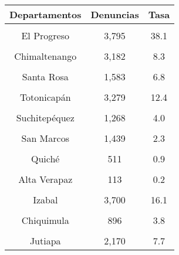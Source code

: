 \begin{tabular}[t]{ccc}
\toprule
\textbf{Departamentos} & \textbf{Denuncias} & \textbf{Tasa}\\
\midrule
\cellcolor[HTML]{B6B3FF}{Guatemala} & \cellcolor[HTML]{B6B3FF}{9,562} & \cellcolor[HTML]{B6B3FF}{5.1}\\
El Progreso & 3,795 & 38.1\\
\cellcolor[HTML]{B6B3FF}{Sacatepéquez} & \cellcolor[HTML]{B6B3FF}{1,926} & \cellcolor[HTML]{B6B3FF}{9.3}\\
Chimaltenango & 3,182 & 8.3\\
\cellcolor[HTML]{B6B3FF}{Escuintla} & \cellcolor[HTML]{B6B3FF}{2,169} & \cellcolor[HTML]{B6B3FF}{5.4}\\
Santa Rosa & 1,583 & 6.8\\
\cellcolor[HTML]{B6B3FF}{Sololá} & \cellcolor[HTML]{B6B3FF}{1,095} & \cellcolor[HTML]{B6B3FF}{4.4}\\
Totonicapán & 3,279 & 12.4\\
\cellcolor[HTML]{B6B3FF}{Quetzaltenango} & \cellcolor[HTML]{B6B3FF}{1,434} & \cellcolor[HTML]{B6B3FF}{2.9}\\
Suchitepéquez & 1,268 & 4.0\\
\cellcolor[HTML]{B6B3FF}{Retalhuleu} & \cellcolor[HTML]{B6B3FF}{1,415} & \cellcolor[HTML]{B6B3FF}{7.3}\\
San Marcos & 1,439 & 2.3\\
\cellcolor[HTML]{B6B3FF}{Huehuetenango} & \cellcolor[HTML]{B6B3FF}{1,360} & \cellcolor[HTML]{B6B3FF}{1.8}\\
Quiché & 511 & 0.9\\
\cellcolor[HTML]{B6B3FF}{Baja Verapaz} & \cellcolor[HTML]{B6B3FF}{1,814} & \cellcolor[HTML]{B6B3FF}{10.4}\\
Alta Verapaz & 113 & 0.2\\
\cellcolor[HTML]{B6B3FF}{Petén} & \cellcolor[HTML]{B6B3FF}{1,411} & \cellcolor[HTML]{B6B3FF}{4.5}\\
Izabal & 3,700 & 16.1\\
\cellcolor[HTML]{B6B3FF}{Zacapa} & \cellcolor[HTML]{B6B3FF}{1,060} & \cellcolor[HTML]{B6B3FF}{7.5}\\
Chiquimula & 896 & 3.8\\
\cellcolor[HTML]{B6B3FF}{Jalapa} & \cellcolor[HTML]{B6B3FF}{378} & \cellcolor[HTML]{B6B3FF}{1.8}\\
Jutiapa & 2,170 & 7.7\\
\bottomrule
\end{tabular}
